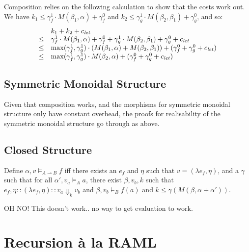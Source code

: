 \documentclass{workingnote}
\begin{document}
Composition relies on the following calculation to show that the costs
work out. We have
$k_1 \leq \gamma_f^1\cdot M(\beta_1, \alpha) + \gamma_f^0$ and
$k_2 \leq \gamma_g^1\cdot M(\beta_2, \beta_1) + \gamma_g^0$, and so:
\begin{displaymath}
  \begin{array}{cl}
    & k_1 + k_2 + c_{\mathit{let}} \\
    \leq & \gamma_f^1\cdot M(\beta_1, \alpha) + \gamma_f^0 + \gamma_g^1\cdot M(\beta_2, \beta_1) + \gamma_g^0 + c_{\mathit{let}} \\
    \leq & \max(\gamma_f^1, \gamma_g^1)\cdot (M(\beta_1, \alpha) + M(\beta_2,\beta_1)) + (\gamma_f^0 + \gamma_g^0 + c_{\mathit{let}}) \\
    \leq & \max(\gamma_f^1, \gamma_g^1)\cdot M(\beta_2, \alpha) + (\gamma_f^0 + \gamma_g^0 + c_{\mathit{let}})
  \end{array}
\end{displaymath}

\subsection{Symmetric Monoidal Structure}

Given that composition works, and the morphisms for symmetric monoidal
structure only have constant overhead, the proofs for realisability of
the symmetric monoidal structure go through as above.

\subsection{Closed Structure}

Define $\alpha, v \models_{A \multimap B} f$ iff there exists an $e_f$
and $\eta$ such that $v = (\lambda e_f, \eta)$, and a $\gamma$ such
that for all $\alpha', v_a \models_A a$, there exist $\beta, v_b, k$
such that $e_f,\eta :: (\lambda e_f, \eta) :: v_a \Downarrow_k v_b$
and $\beta, v_b \models_B f(a)$ and
$k \leq \gamma(M(\beta, \alpha + \alpha'))$.

OH NO! This doesn't work.. no way to get evaluation to work.

\section{Recursion \`a la RAML}
\end{document}
